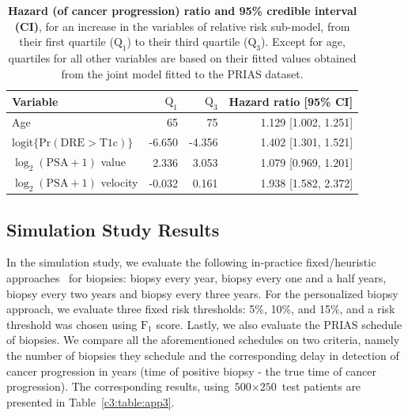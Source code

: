 \begin{subappendices}
\begin{table}
\small
\centering
\caption{\textbf{Hazard (of cancer progression) ratio and 95\% credible interval (CI)}, for an increase in the variables of relative risk sub-model, from their first quartile ($\mbox{Q}_1$) to their third quartile ($\mbox{Q}_3$). Except for age, quartiles for all other variables are based on their fitted values obtained from the joint model fitted to the PRIAS dataset.}
\label{c3:table:app2}
\begin{tabular}{lrrr}
\toprule
Variable                      & $\mbox{Q}_1$   & $\mbox{Q}_3$ & Hazard ratio [95\% CI] \\
\midrule
Age & 65 & 75 & 1.129 [1.002, 1.251] \\
$\mbox{logit} \big\{\mbox{Pr}(\mbox{DRE} > \mbox{T1c})\big\}$ & -6.650 & -4.356 & 1.402 [1.301, 1.521]\\
$\log_2 (\mbox{PSA} + 1)$ value & 2.336 & 3.053 & 1.079 [0.969, 1.201]\\
$\log_2 (\mbox{PSA} + 1)$ velocity & -0.032 & 0.161 & 1.938 [1.582, 2.372]\\
\bottomrule
\end{tabular}
\end{table}

\subsection{Simulation Study Results}
In the simulation study, we evaluate the following in-practice fixed/heuristic approaches~\citep{loeb2014heterogeneity, inoue2018comparative} for biopsies: biopsy every year, biopsy every one and a half years, biopsy every two years and biopsy every three years. For the personalized biopsy approach, we evaluate three fixed risk thresholds: 5\%, 10\%, and 15\%, and a risk threshold was chosen using $\mbox{F}_1$ score. Lastly, we also evaluate the PRIAS schedule of biopsies. We compare all the aforementioned schedules on two criteria, namely the number of biopsies they schedule and the corresponding delay in detection of cancer progression in years (time of positive biopsy - the true time of cancer progression). The corresponding results, using ${\mbox{500} \times \mbox{250}}$ test patients are presented in Table~\ref{c3:table:app3}.


\end{subappendices}
